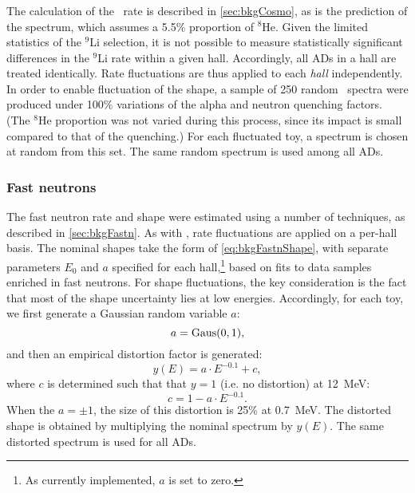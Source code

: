 \documentclass[../thesis.tex]{subfiles}
\begin{document}
\subsubsection{\LiHe}

The calculation of the \LiHe\ rate is described in \autoref{sec:bkgCosmo}, as is the prediction of the spectrum, which assumes a 5.5\% proportion of $^8$He. Given the limited statistics of the $^9$Li selection, it is not possible to measure statistically significant differences in the $^9$Li rate within a given hall. Accordingly, all ADs in a hall are treated identically. Rate fluctuations are thus applied to each \emph{hall} independently. In order to enable fluctuation of the shape, a sample of 250 random \LiHe\ spectra were produced under 100\% variations of the alpha and neutron quenching factors. (The $^8$He proportion was not varied during this process, since its impact is small compared to that of the quenching.) For each fluctuated toy, a spectrum is chosen at random from this set. The same random spectrum is used among all ADs.

\subsubsection{Fast neutrons}

The fast neutron rate and shape were estimated using a number of techniques, as described in \autoref{sec:bkgFastn}. As with \LiHe, rate fluctuations are applied on a per-hall basis. The nominal shapes take the form of \autoref{eq:bkgFastnShape}, with separate parameters $E_0$ and $a$ specified for each hall,\footnote{As currently implemented, $a$ is set to zero.} based on fits to data samples enriched in fast neutrons. For shape fluctuations, the key consideration is the fact that most of the shape uncertainty lies at low energies. Accordingly, for each toy, we first generate a Gaussian random variable $a$:
\begin{equation}
  a = \operatorname{Gaus}(0,1),
\end{equation}
and then an empirical distortion factor is generated:
\begin{equation}
  y(E) = a \cdot E^{-0.1} + c,
\end{equation}
where $c$ is determined such that that $y = 1$ (i.e. no distortion) at 12~MeV:
\begin{equation}
  c = 1 - a \cdot E^{-0.1}.
\end{equation}
When the $a = \pm1$, the size of this distortion is 25\% at 0.7~MeV. The distorted shape is obtained by multiplying the nominal spectrum by $y(E)$. The same distorted spectrum is used for all ADs.
\end{document}
